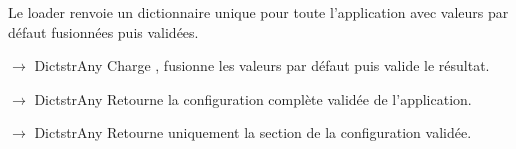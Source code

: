\documentclass[letterpaper,10pt,french]{sphinxmanual}
\begin{document}
\sphinxAtStartPar
Le loader renvoie un dictionnaire unique pour toute l’application avec
valeurs par défaut fusionnées puis validées.

\begin{fulllineitems}
\label{\detokenize{api/config:config.config_loader.load_config}}
\pysigstartsignatures
\pysiglinewithargsret
{}
{}
{{ $\rightarrow$ Dict\DUrole{p}{{[}}strAny\DUrole{p}{{]}}}}
\pysigstopsignatures
\sphinxAtStartPar
Charge , fusionne les valeurs par défaut puis valide le résultat.

\end{fulllineitems}


\begin{fulllineitems}
\label{\detokenize{api/config:config.config_loader.get_app_config}}
\pysigstartsignatures
\pysiglinewithargsret
{}
{}
{{ $\rightarrow$ Dict\DUrole{p}{{[}}strAny\DUrole{p}{{]}}}}
\pysigstopsignatures
\sphinxAtStartPar
Retourne la configuration complète validée de l’application.

\end{fulllineitems}


\begin{fulllineitems}
\label{\detokenize{api/config:config.config_loader.get_speaker_config}}
\pysigstartsignatures
\pysiglinewithargsret
{}
{}
{{ $\rightarrow$ Dict\DUrole{p}{{[}}strAny\DUrole{p}{{]}}}}
\pysigstopsignatures
\sphinxAtStartPar
Retourne uniquement la section  de la configuration validée.

\end{fulllineitems}
\end{document}
